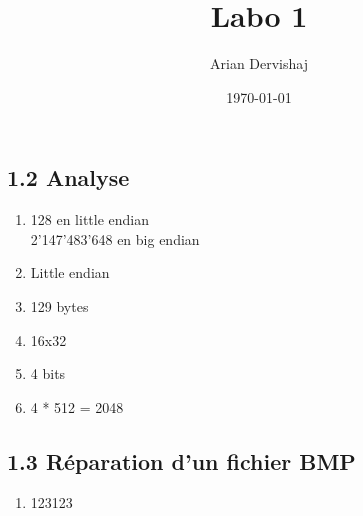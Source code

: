 \documentclass[a4paper, 12pt]{article}
\title{Labo 1}
\author{Arian Dervishaj}
\date{\today}
\begin{document}
\maketitle

\subsection*{1.2 Analyse}
\begin{enumerate}
    \item 128 en little endian\\ 
          2'147'483'648 en big endian
    \item Little endian
    \item 129 bytes
    \item 16x32
    \item 4 bits
    \item 4 * 512 = 2048

\end{enumerate}

\subsection*{1.3 Réparation d'un fichier BMP}
\begin{enumerate}
    \item 123123

\end{enumerate}
\end{document}
